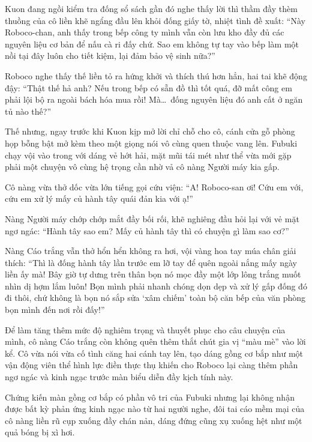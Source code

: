 \documentclass[../main.tex]{subfiles}
\begin{document}
Kuon đang ngồi kiểm tra đống sổ sách gần đó nghe thấy lời thì thầm đầy thèm thuồng của cô liền khẽ ngẩng đầu lên khỏi đống giấy tờ, nhiệt tình đề xuất: ``Này Roboco-chan, anh thấy trong bếp công ty mình vẫn còn lưu kho đầy đủ các nguyên liệu cơ bản để nấu cà ri đấy chứ. Sao em không tự tay vào bếp làm một nồi tại đây luôn cho tiết kiệm, lại đảm bảo vệ sinh nữa?''

Roboco nghe thấy thế liền tỏ ra hứng khởi và thích thú hơn hẳn, hai tai khẽ động đậy: ``Thật thế hả anh? Nếu trong bếp có sẵn đồ thì tốt quá, đỡ mất công em phải lội bộ ra ngoài bách hóa mua rồi! Mà\dots\ đống nguyên liệu đó anh cất ở ngăn tủ nào thế?''

Thế nhưng, ngay trước khi Kuon kịp mở lời chỉ chỗ cho cô, cánh cửa gỗ phòng họp bỗng bật mở kèm theo một giọng nói vô cùng quen thuộc vang lên. Fubuki chạy vội vào trong với dáng vẻ hớt hải, mặt mũi tái mét như thể vừa mới gặp phải một chuyện vô cùng hệ trọng cần nhờ vả cô nàng Người máy kia gấp.

Cô nàng vừa thở dốc vừa lớn tiếng gọi cứu viện: ``A! Roboco-san ơi! Cứu em với, cứu em xử lý mấy củ hành tây quái đản kia với ạ!''

Nàng Người máy chớp chớp mắt đầy bối rối, khẽ nghiêng đầu hỏi lại với vẻ mặt ngơ ngác: ``Hành tây sao em? Mấy củ hành tây thì có chuyện gì làm sao cơ?''

Nàng Cáo trắng vẫn thở hổn hển không ra hơi, vội vàng hoa tay múa chân giải thích: ``Thì là đống hành tây lần trước em lỡ tay để quên ngoài nắng mấy ngày liền ấy mà! Bây giờ tự dưng trên thân bọn nó mọc đầy một lớp lông trắng muốt nhìn dị hợm lắm luôn! Bọn mình phải nhanh chóng dọn dẹp và xử lý gấp đống đó đi thôi, chứ không là bọn nó sắp sửa `xâm chiếm' toàn bộ căn bếp của văn phòng bọn mình đến nơi rồi đấy!''

Để làm tăng thêm mức độ nghiêm trọng và thuyết phục cho câu chuyện của mình, cô nàng Cáo trắng còn không quên thêm thắt chút gia vị ``màu mè'' vào lời kể. Cô vừa nói vừa cố tình căng hai cánh tay lên, tạo dáng gồng cơ bắp như một vận động viên thể hình lực điền thực thụ khiến cho Roboco lại càng thêm phần ngơ ngác và kinh ngạc trước màn biểu diễn đầy kịch tính này.


Chứng kiến màn gồng cơ bắp có phần vô tri của Fubuki nhưng lại không nhận được bất kỳ phản ứng kinh ngạc nào từ hai người nghe, đôi tai cáo mềm mại của cô nàng liền rũ cụp xuống đầy chán nản, dáng đứng cũng xụ xuống hệt như một quả bóng bị xì hơi.
\end{document}
